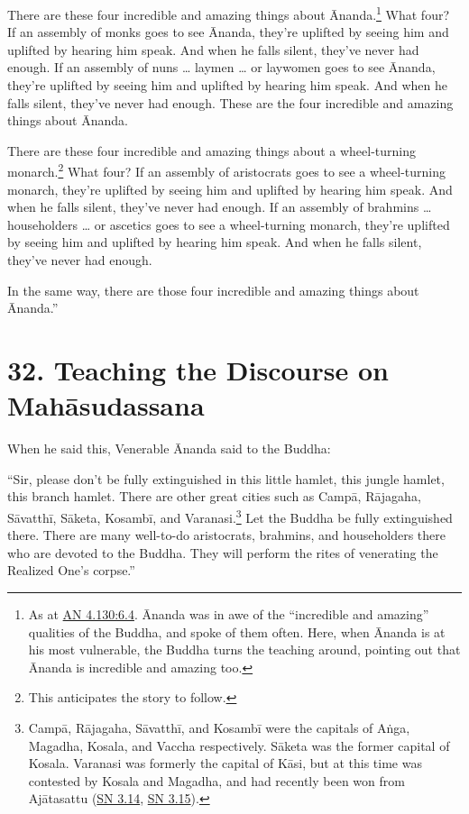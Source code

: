 \documentclass[12pt,openany]{book}%
\begin{document}
There are these four incredible and amazing things about Ānanda.\footnote{As at \href{https://suttacentral.net/an4.130/en/sujato\#6.4}{AN 4.130:6.4}. Ānanda was in awe of the “incredible and amazing” qualities of the Buddha, and spoke of them often. Here, when Ānanda is at his most vulnerable, the Buddha turns the teaching around, pointing out that Ānanda is incredible and amazing too. } What four? If an assembly of monks goes to see Ānanda, they’re uplifted by seeing him and uplifted by hearing him speak. And when he falls silent, they’ve never had enough. If an assembly of nuns … laymen … or laywomen goes to see Ānanda, they’re uplifted by seeing him and uplifted by hearing him speak. And when he falls silent, they’ve never had enough. These are the four incredible and amazing things about Ānanda. 

There are these four incredible and amazing things about a wheel-turning monarch.\footnote{This anticipates the story to follow. } What four? If an assembly of aristocrats goes to see a wheel-turning monarch, they’re uplifted by seeing him and uplifted by hearing him speak. And when he falls silent, they’ve never had enough. If an assembly of brahmins … householders … or ascetics goes to see a wheel-turning monarch, they’re uplifted by seeing him and uplifted by hearing him speak. And when he falls silent, they’ve never had enough. 

In the same way, there are those four incredible and amazing things about Ānanda.” 

\section*{32. Teaching the Discourse on \textsanskrit{Mahāsudassana} }

When he said this, Venerable Ānanda said to the Buddha: 

“Sir, please don’t be fully extinguished in this little hamlet, this jungle hamlet, this branch hamlet. There are other great cities such as \textsanskrit{Campā}, \textsanskrit{Rājagaha}, \textsanskrit{Sāvatthī}, \textsanskrit{Sāketa}, \textsanskrit{Kosambī}, and Varanasi.\footnote{\textsanskrit{Campā}, \textsanskrit{Rājagaha}, \textsanskrit{Sāvatthī}, and \textsanskrit{Kosambī} were the capitals of \textsanskrit{Aṅga}, Magadha, Kosala, and Vaccha respectively. \textsanskrit{Sāketa} was the former capital of Kosala. Varanasi was formerly the capital of \textsanskrit{Kāsi}, but at this time was contested by Kosala and Magadha, and had recently been won from \textsanskrit{Ajātasattu} (\href{https://suttacentral.net/sn3.14/en/sujato}{SN 3.14}, \href{https://suttacentral.net/sn3.15/en/sujato}{SN 3.15}). } Let the Buddha be fully extinguished there. There are many well-to-do aristocrats, brahmins, and householders there who are devoted to the Buddha. They will perform the rites of venerating the Realized One’s corpse.” 
\end{document}
